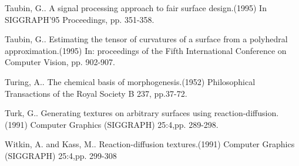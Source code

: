 \documentclass{elsart}
\begin{document}
\begin{thebibliography}{00}
 Taubin, G.. A signal processing approach to fair surface
design.(1995) In SIGGRAPH'95 Proceedings, pp. 351-358.


 Taubin, G.. Estimating the tensor of curvatures of a
surface from a polyhedral approximation.(1995) In: proceedings of
the Fifth International Conference on Computer Vision, pp. 902-907.


 Turing, A.. The chemical basis of
morphogenesis.(1952) Philosophical Transactions of the Royal Society
B 237, pp.37-72.

 Turk, G.. Generating textures on arbitrary surfaces using
reaction-diffusion.(1991) Computer Graphics (SIGGRAPH) 25:4,pp.
289-298.

 Witkin, A. and Kass, M.. Reaction-diffusion
textures.(1991) Computer Graphics (SIGGRAPH) 25:4,pp. 299-308



\end{thebibliography}
\end{document}
